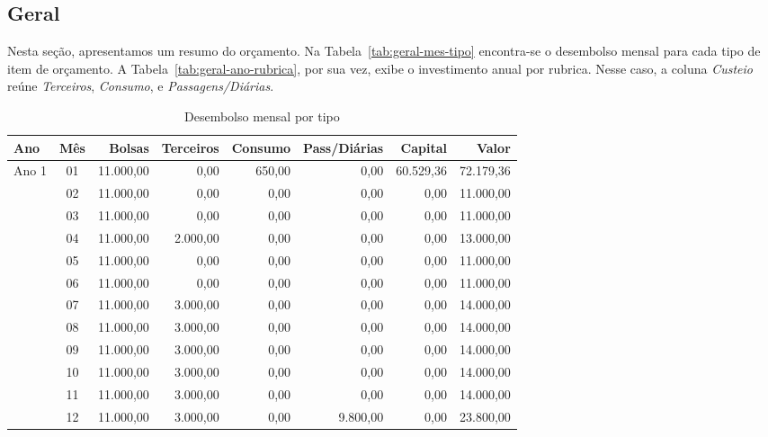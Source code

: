\subsection{Geral}
Nesta seção, apresentamos um resumo do orçamento. Na Tabela~\ref{tab:geral-mes-tipo} encontra-se o desembolso mensal para cada tipo de item de orçamento.
A Tabela~\ref{tab:geral-ano-rubrica}, por sua vez, exibe o investimento anual por rubrica. Nesse caso, a coluna \emph{Custeio} reúne \emph{Terceiros}, \emph{Consumo}, e \emph{Passagens/Diárias}.
\begin{table}[!h]
\scriptsize
	\caption{Desembolso mensal por tipo}
\centering
\begin{tabular}{lcrrrrrr}
\toprule
   \rowcolor{lgray}
	Ano  & Mês      & Bolsas  & Terceiros  & Consumo & Pass/Diárias & Capital    & Valor \\
\midrule
       Ano 1 & 01       &  11.000,00 &      0,00 & 650,00  &     0,00     & 60.529,36 &  72.179,36\\
             & 02       &  11.000,00 &      0,00 &   0,00  &     0,00     &      0,00 &   11.000,00\\
             & 03       &  11.000,00 &      0,00 &   0,00  &     0,00     &      0,00 &   11.000,00\\
             & 04       &  11.000,00 &  2.000,00 &   0,00  &     0,00     &      0,00 &   13.000,00\\
             & 05       &  11.000,00 &      0,00 &   0,00  &     0,00     &      0,00 &   11.000,00\\
             & 06       &  11.000,00 &      0,00 &   0,00  &     0,00     &      0,00 &   11.000,00\\
             & 07       &  11.000,00 &  3.000,00 &   0,00  &     0,00     &      0,00 &   14.000,00\\
             & 08       &  11.000,00 &  3.000,00 &   0,00  &     0,00     &      0,00 &   14.000,00\\
             & 09       &  11.000,00 &  3.000,00 &   0,00  &     0,00     &      0,00 &   14.000,00\\
             & 10       &  11.000,00 &  3.000,00 &   0,00  &     0,00     &      0,00 &   14.000,00\\
             & 11       &  11.000,00 &  3.000,00 &   0,00  &     0,00     &      0,00 &   14.000,00\\
             & 12       &  11.000,00 &  3.000,00 &   0,00  & 9.800,00     &      0,00 &   23.800,00\\

\end{tabular}
\end{table}
